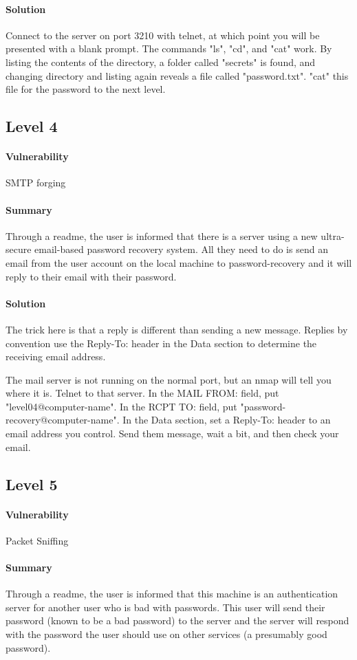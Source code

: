 \documentclass[12pt]{article}
\begin{document}
\paragraph{Solution} Connect to the server on port 3210 with telnet, at which point you will be presented with a blank prompt. The commands "ls", "cd", and "cat" work. By listing the contents of the directory, a folder called "secrets" is found, and changing directory and listing again reveals a file called "password.txt". "cat" this file for the password to the next level.

\subsection{Level 4}
\paragraph{Vulnerability} SMTP forging
\paragraph{Summary} Through a readme, the user is informed that there is a
server using a new ultra-secure email-based password recovery system. All they need to do
is send an email from the user account on the local machine to
password-recovery and it will reply to their email with their password.
\paragraph{Solution} The trick here is that a reply is different than sending a
new message. Replies by convention use the Reply-To: header in the Data section
to determine the receiving email address. 

The mail server is not running on the normal port, but an
nmap will tell you where it is.  Telnet to that server. In the MAIL FROM: field,
put "level04@computer-name". In the RCPT TO: field, put
"password-recovery@computer-name". In the Data section, set a Reply-To:
header to an email address you control. Send them message, wait a bit, and then
check your email. 
\subsection{Level 5}
\paragraph{Vulnerability} Packet Sniffing
\paragraph{Summary}  Through a readme, the user is informed that this machine
is an authentication server for another user who is bad with passwords.  This user
will send their password (known to be a bad password) to the server and the server
will respond with the password the user should use on other services (a presumably good
password).
\end{document}
